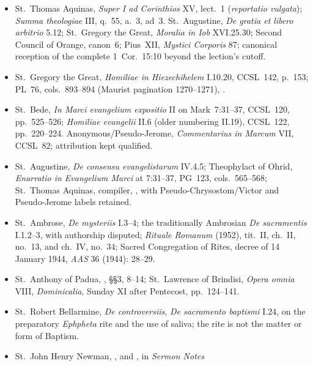 {\begin{itemize}[itemsep=0em,topsep=0.15em,parsep=0pt]
\item St.~Thomas Aquinas, \emph{Super I ad Corinthios} XV, lect.~1
(\emph{reportatio vulgata}); \emph{Summa theologiae} III, q.~55, a.~3,
ad~3. St.~Augustine, \emph{De gratia et libero
arbitrio} 5.12; St.~Gregory the Great, \emph{Moralia in Iob} XVI.25.30;
Second Council of Orange, canon~6; Pius~XII, \emph{Mystici Corporis} 87;
canonical reception of the complete 1~Cor.~15:10 beyond the lection's cutoff.
\item St.~Gregory the Great, \emph{Homiliae in Hiezechihelem} I.10.20,
CCSL~142, p.~153; PL~76, cols.~893--894 (Maurist pagination 1270--1271),
.
\item St.~Bede, \emph{In Marci evangelium expositio} II on Mark~7:31--37,
CCSL~120, pp.~525--526; \emph{Homiliae evangelii} II.6 (older numbering
II.19), CCSL~122, pp.~220--224. Anonymous/Pseudo-Jerome,
\emph{Commentarius in Marcum} VII, CCSL~82; attribution kept qualified.
\item St.~Augustine, \emph{De consensu evangelistarum} IV.4.5;
Theophylact of Ohrid, \emph{Enarratio in Evangelium Marci} at 7:31--37,
PG~123, cols.~565--568; St.~Thomas Aquinas, compiler,
, with Pseudo-Chrysostom/Victor and Pseudo-Jerome labels retained.
\item St.~Ambrose, \emph{De mysteriis} I.3--4; the traditionally Ambrosian
\emph{De sacramentis} I.1.2--3, with authorship disputed; \emph{Rituale
Romanum} (1952), tit.~II, ch.~II, no.~13, and
ch.~IV, no.~34; Sacred Congregation of Rites, decree of 14 January 1944,
\emph{AAS} 36 (1944): 28--29.
\item St.~Anthony of Padua, , §§3, 8--14;
St.~Lawrence of Brindisi, \emph{Opera omnia} VIII, \emph{Dominicalia},
Sunday XI after Pentecost, pp.~124--141.
\item St.~Robert Bellarmine, \emph{De controversiis}, \emph{De sacramento
baptismi} I.24, on the preparatory \emph{Ephpheta} rite and the use of saliva;
the rite is not the matter or form of Baptism.
\item St.~John Henry Newman, , and
, in \emph{Sermon Notes}

\end{itemize}}
